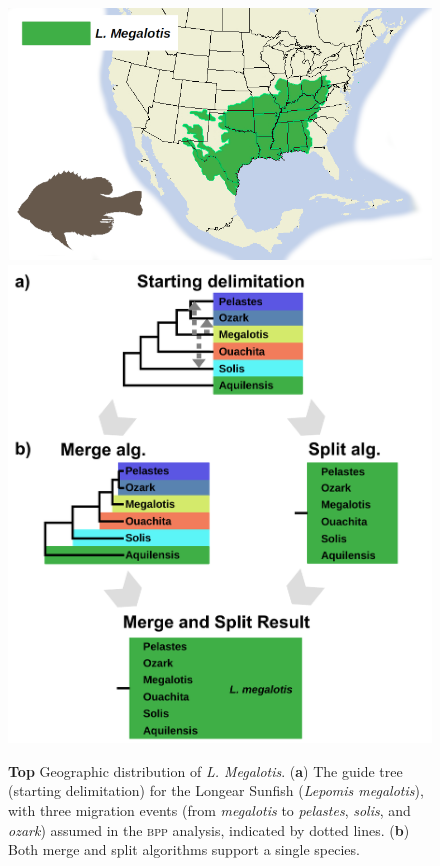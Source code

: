 \documentclass{article1}
\newcommand{\red}[1]{{\color{red}{#1}}}
\newcommand{\blue}[1]{{\color{blue}{#1}}}
\begin{document}
\begin{figure}[h!]
    \centering %
    \includegraphics[scale=0.28]{figs/Sunfish/figure} %
    \includegraphics[scale=0.48]{figs/Sunfish/sunfish_results} %
    
    \caption{\textbf{Top} Geographic distribution of \textit{L. Megalotis}. (\textbf{a}) The guide tree (starting delimitation) for the Longear Sunfish
    (\textit{Lepomis megalotis}), with three migration events (from \textit{megalotis} to
    \textit{pelastes}, \textit{solis}, and \textit{ozark}) assumed in the \textsc{bpp}
    analysis, indicated by dotted lines.  %
    (\textbf{b}) Both merge and split algorithms support a single species.  \red{[show
    merge result, as in figures for the other datasets.  We need care to detail, and
    consistency among datasets.]}\blue{[merge and split results are identical, updated figure subtitles to reflect this, also updated the top figure]}%
    } \label{fig:sunfish}
\end{figure}
\end{document}
